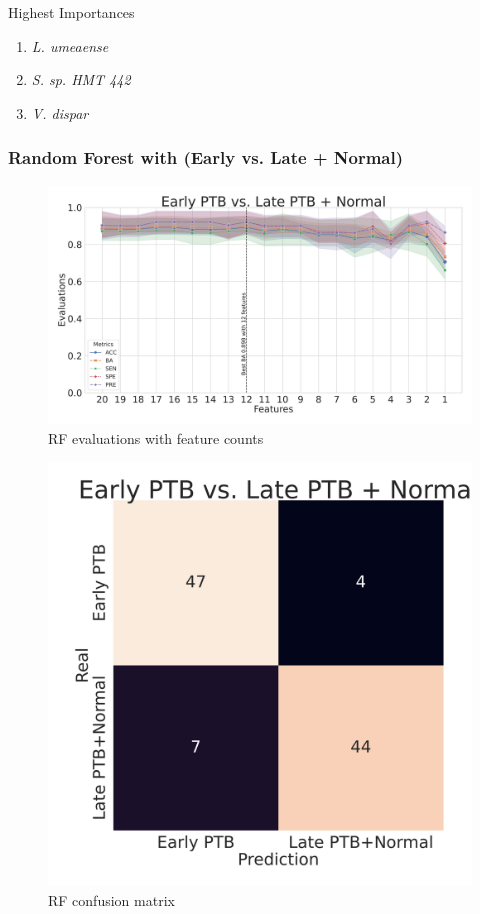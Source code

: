\documentclass{beamer}
\begin{document}
\begin{frame}[allowframebreaks]
        \begin{block}{Highest Importances}
            \begin{enumerate}
                \item \textit{L. umeaense}
                \item \textit{S. sp. HMT 442}
                \item \textit{V. dispar}
            \end{enumerate}
        \end{block}
    \end{frame}

    \begin{frame}[allowframebreaks]
        \frametitle{Random Forest with (Early vs. Late + Normal)}

        \begin{figure}
            \includegraphics[width=0.8 \linewidth]{figures/RandomForest_Proportion/RF-two.DADA2.homd.Mouth/metrics.pdf}
            \caption{RF evaluations with feature counts}
        \end{figure}

        \begin{figure}
            \includegraphics[width=0.5 \linewidth]{figures/RandomForest_Proportion/RF-two.DADA2.homd.Mouth/heatmap.pdf}
            \caption{RF confusion matrix}
        \end{figure}


\end{frame}
\end{document}
